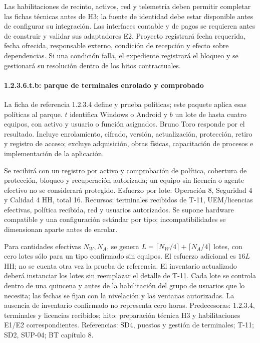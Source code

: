 Las habilitaciones de recinto, activos, red y telemetría deben permitir completar las fichas técnicas antes de H3; la fuente de identidad debe estar disponible antes de configurar su integración. Las interfaces contable y de pagos se requieren antes de construir y validar sus adaptadores E2. Proyecto registrará fecha requerida, fecha ofrecida, responsable externo, condición de recepción y efecto sobre dependencias. Si una condición falla, el expediente registrará el bloqueo y se gestionará su resolución dentro de los hitos contractuales.

\paragraph{1.2.3.6.t.b: parque de terminales enrolado y comprobado}
La ficha de referencia 1.2.3.4 define y prueba políticas; este paquete aplica esas políticas al parque. $t$ identifica Windows o Android y $b$ un lote de hasta cuatro equipos, con activo y usuario o función asignados. Bruno Toro responde por el resultado. Incluye enrolamiento, cifrado, versión, actualización, protección, retiro y registro de acceso; excluye adquisición, obras físicas, capacitación de procesos e implementación de la aplicación.

Se recibirá con un registro por activo y comprobación de política, cobertura de protección, bloqueo y recuperación autorizada; un equipo sin licencia o agente efectivo no se considerará protegido. Esfuerzo por lote: Operación 8, Seguridad 4 y Calidad 4 HH, total 16. Recursos: terminales recibidos de T-11, UEM/licencias efectivas, política recibida, red y usuarios autorizados. Se supone hardware compatible y una configuración estándar por tipo; incompatibilidades se dimensionan aparte antes de enrolar.

Para cantidades efectivas $N_W,N_A$, se genera $L=\lceil N_W/4\rceil+\lceil N_A/4\rceil$ lotes, con cero lotes sólo para un tipo confirmado sin equipos. El esfuerzo adicional es $16L$ HH; no se cuenta otra vez la prueba de referencia. El inventario actualizado deberá instanciar los lotes sin reemplazar el detalle de T-11. Cada lote se controla dentro de una quincena y antes de la habilitación del grupo de usuarios que lo necesita; las fechas se fijan con la nivelación y las ventanas autorizadas. La ausencia de inventario confirmado no representa cero horas. Predecesoras: 1.2.3.4, terminales y licencias recibidos; hito: preparación técnica H3 y habilitaciones E1/E2 correspondientes. Referencias: SD4, puestos y gestión de terminales; T-11; SD2, SUP-04; BT capítulo 8.
